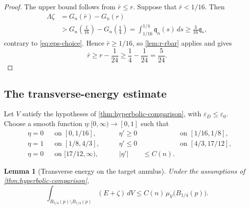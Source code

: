 \documentclass[11pt,reqno]{amsart}
\numberwithin{equation}{section}
\newtheorem{lemma}[lemma]{Lemma}
\theoremstyle{definition}
\theoremstyle{remark}
\newcommand{\eps}{\varepsilon}
\begin{document}
\begin{proof}
The upper bound follows from $\bar r\le r$.  Suppose that $\bar r<1/16$.  Then
\begin{align*}
 \Lambda\zeta
 &=G_n(\bar r)-G_n(r)\\
 &>G_n\!\left(\frac1{16}\right)-G_n\!\left(\frac14\right)
 =\int_{1/16}^{1/4}\mathfrak q_n(s)\,ds
 \ge\frac3{16}\mathfrak q_*,
\end{align*}
contrary to \eqref{eq:eps-choice}.  Hence $\bar r\ge1/16$, so \cref{lem:r-rbar} applies and gives
\[
 \bar r\ge r-\frac1{24}\ge\frac14-\frac1{24}=\frac5{24}.
\]
\end{proof}

\subsection{The transverse-energy estimate}\label{sec:transverse}

Let $V$ satisfy the hypotheses of \cref{thm:hyperbolic-comparison}, with
$\eps_D\le\eps_0$.  Choose a smooth function
$\eta:[0,\infty)\to[0,1]$ such that
\begin{equation}\label{eq:eta}
\begin{aligned}
 &\eta=0 &&\text{on }[0,1/16],
 &\qquad \eta'\ge0 &&\text{on }[1/16,1/8],\\
 &\eta=1 &&\text{on }[1/8,4/3],
 &\qquad \eta'\le0 &&\text{on }[4/3,17/12],\\
 &\eta=0 &&\text{on }[17/12,\infty),
 &\qquad |\eta'|&\le C(n).
\end{aligned}
\end{equation}

\begin{lemma}[Transverse energy on the target annulus]\label{lem:transverse-energy}
Under the assumptions of \cref{thm:hyperbolic-comparison},
\begin{equation}\label{eq:transverse-energy}
 \int_{B_{5/4}(p)\setminus B_{1/4}(p)}(E+\zeta)\,dV
 \le C(n)\,\mu_V\bigl(B_{1/4}(p)\bigr).
\end{equation}
\end{lemma}
\end{document}
